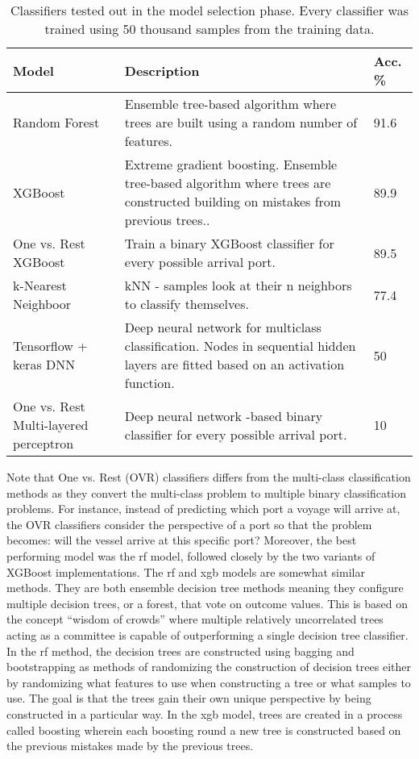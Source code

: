 \begin{table}[htbp]
    \centering
    \small{\begin{tabularx}{1.0\textwidth}{p{1.0in} X p{0.7in}}
            \bfseries{Model} & \bfseries{Description} & \bfseries{Acc. \%} \\ \toprule
            Random Forest & Ensemble tree-based algorithm where trees are built using a random number of features. & 91.6 \\ \midrule
            XGBoost & Extreme gradient boosting. Ensemble tree-based algorithm where trees are constructed building on mistakes from previous trees.. & 89.9 \\ \midrule
            One vs. Rest XGBoost & Train a binary XGBoost classifier for every possible arrival port.  & 89.5 \\ \midrule
            k-Nearest Neighboor & kNN - samples look at their n neighbors to classify themselves. & 77.4 \\ \midrule
            Tensorflow + keras DNN & Deep neural network for multiclass classification. Nodes in sequential hidden layers are fitted based on an activation function. & 50 \\ \midrule
            One vs. Rest Multi-layered perceptron & Deep neural network -based binary classifier for every possible arrival port. & 10 \\ \bottomrule
    \end{tabularx}}
\caption{Classifiers tested out in the model selection phase. Every classifier was trained using 50 thousand samples from the training data.}\label{tab:model_selection}
\end{table}

Note that One vs. Rest (OVR) classifiers differs from the multi-class classification methods as they convert the multi-class problem to multiple binary classification problems. For instance, instead of predicting which port a voyage will arrive at, the OVR classifiers consider the perspective of a port so that the problem becomes: will the vessel arrive at this specific port? Moreover, the best performing model was the \acrfull{rf} model, followed closely by the two variants of XGBoost implementations. The \acrshort{rf} and \acrshort{xgb} models are somewhat similar methods. They are both ensemble decision tree methods meaning they configure multiple decision trees, or a forest, that vote on outcome values. This is based on the concept ``wisdom of crowds'' where multiple relatively uncorrelated trees acting as a committee is capable of outperforming a single decision tree classifier. In the \acrshort{rf} method, the decision trees are constructed using bagging and bootstrapping as methods of randomizing the construction of decision trees either by randomizing what features to use when constructing a tree or what samples to use. The goal is that the trees gain their own unique perspective by being constructed in a particular way. In the \acrshort{xgb} model, trees are created in a process called boosting wherein each boosting round a new tree is constructed based on the previous mistakes made by the previous trees.

